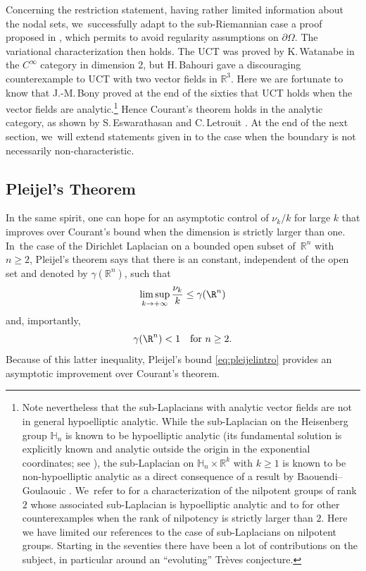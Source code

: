 Concerning the restriction statement, having rather limited information about the nodal sets, we~successfully adapt to the sub-Riemannian case a proof proposed in \cite{MP}, which permits to avoid regularity assumptions on $\partial \Omega$. The variational characterization then holds. The UCT was proved by K.\,Watanabe \cite{Wa} in the $C^\infty$ category in dimension 2, but H.\,Bahouri \cite{Ba, Ba2} gave a discouraging counterexample to UCT with two vector fields in $ \mathbb R^3$.
Here
we are fortunate to know that J.-M.\,Bony proved at the end of the sixties \cite{Bo} that UCT holds when the vector fields are analytic.\footnote{Note nevertheless that the sub-Laplacians with analytic vector fields are not in general hypoelliptic analytic. While the sub-Laplacian on the Heisenberg group $\mathbb H_n$ is known to be hypoelliptic analytic (its fundamental solution is explicitly known and analytic outside the origin
in the exponential coordinates; see \cite{Fo0}), the sub-Laplacian on $\mathbb H_n\times \mathbb R^k$ with $k\geq 1$ is known to be non-hypoelliptic analytic as a direct consequence of a result by Baouendi--Goulaouic \cite{BaGo}. We~refer to \cite{Me2} for a characterization of the nilpotent groups of rank $2$ whose associated sub-Laplacian is hypoelliptic analytic and to \cite{Hel} for other counterexamples when the rank of nilpotency is strictly larger than $2$. Here we have limited our references to the case of sub-Laplacians on nilpotent groups. Starting in the seventies there have been a lot of contributions on the subject, in particular around an ``evoluting'' Trèves conjecture.}
Hence Courant's theorem holds in the analytic category, as shown by S.\,Eswarathasan and C.\,Letrouit \cite{EL}. At the end of the next section, we~will extend statements given in \cite{EL} to the case when the boundary is not necessarily non-characteristic.

\subsection{Pleijel's Theorem}
In the same spirit, one can hope for an asymptotic control of $ \nu_k/k$ for large $k$ that improves over Courant's bound when the dimension is strictly larger than one. In~the case of the Dirichlet Laplacian on a bounded open subset of~$\mathbb R^n$ with $n\geq 2$, Pleijel's theorem \cite{Pl} says that there is an constant, independent of the open set and denoted by $\gamma(\mathbb R^n)$, such that
\begin{equation}
\label{eq:pleijelintro}
\limsup_{k\to +\infty} \frac{\nu_k}{k} \leq \gamma(\R^n)
\end{equation}
and, importantly,
\begin{equation}
\label{eq:pleijelintro2}
\gamma(\R^n)<1
\quad\text{for}\ n\geq 2.
\end{equation}
Because of this latter inequality, Pleijel's bound \eqref{eq:pleijelintro} provides an asymptotic improvement over Courant's theorem.

